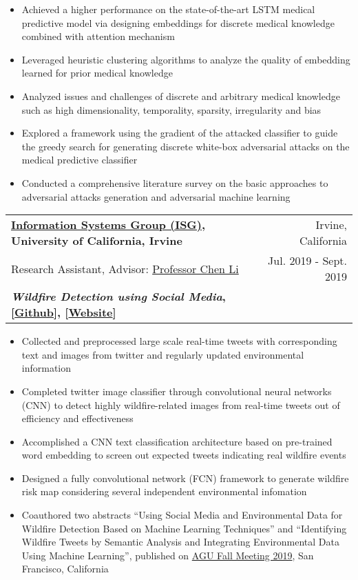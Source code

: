 \documentclass[letterpaper,11pt]{article}
\makeatletter
\newcommand{\resumeSubheading}[6]{
  \vspace{-1pt}\item
    \begin{tabular*}{0.97\textwidth}[t]{l@{\extracolsep{\fill}}r}
      \textbf{#1} & #2 \\
      #3 & #4 \\
      \textbf{#5} & \textbf{#6} \\
    \end{tabular*}\vspace{-5pt}
}
\makeatother
\begin{document}
        \begin{itemize}
          \item Achieved a higher performance on the state-of-the-art LSTM medical predictive model via designing embeddings for discrete medical knowledge combined with attention mechanism
          
          \item Leveraged heuristic clustering algorithms to analyze the quality of embedding learned for prior medical knowledge
       
          \item Analyzed issues and challenges of discrete and arbitrary medical knowledge such as high dimensionality, temporality, sparsity, irregularity and bias
          
          \item Explored a framework using the gradient of the attacked classifier to guide the greedy search for generating discrete white-box adversarial attacks on the medical predictive classifier 
          
          \item Conducted a comprehensive literature survey on the basic approaches to adversarial attacks generation and adversarial machine learning
          
        \end{itemize}
        
    \resumeSubheading
      {\href{https://isg.ics.uci.edu/}{Information Systems Group (ISG)}, University of California, Irvine}{Irvine, California}
      {Research Assistant, Advisor: \href{https://chenli.ics.uci.edu/}{Professor Chen Li}}{Jul. 2019 - Sept. 2019}
      {\textit{Wildfire Detection using Social Media}, [\href{https://github.com/ISG-ICS/Wildfires}{Github}], [\href{http://wildfires.ics.uci.edu:2333/}{Website}]}{}
      
        \begin{itemize}
          \item Collected and preprocessed large scale real-time tweets with corresponding text and images from twitter and regularly updated environmental information
          \item Completed twitter image classifier through convolutional neural networks (CNN) to detect highly wildfire-related images from real-time tweets out of efficiency and effectiveness
          \item Accomplished a CNN text classification architecture based on pre-trained word embedding to screen out expected tweets indicating real wildfire events
          \item Designed a fully convolutional network (FCN) framework to generate wildfire risk map considering several independent environmental infomation
          \item Coauthored two abstracts ``Using Social Media and Environmental Data for Wildfire Detection Based on Machine Learning Techniques'' and ``Identifying Wildfire Tweets by Semantic Analysis and Integrating Environmental Data Using Machine Learning'', published on \href{https://www.agu.org/fall-meeting}{AGU Fall Meeting 2019}, San Francisco, California
        \end{itemize}
        
\end{document}
